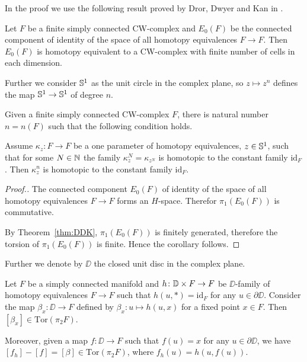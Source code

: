 \documentclass{amsart}
\begin{document}
In the proof we use the following result proved by Dror,  Dwyer and Kan in \cite{DDK}.

\begin{thm}\label{thm:DDK}
Let $F$ be a finite simply connected CW-complex and 
$E_0(F)$ be the connected component of identity of the 
space of all homotopy equivalences $F\to F$. Then $E_0(F)$ is homotopy equivalent to a CW-complex with finite number of cells in each dimension.
\end{thm}

Further we consider ${\Bbb S}^1$ as the unit circle in the complex plane, so  $z\mapsto z^n$ defines the map ${\Bbb S}^1\to {\Bbb S}^1$ of degree $n$.

\begin{cor}\label{cor:DDK}
Given a finite simply connected CW-complex $F$, there is natural number $n=n(F)$ such that the following condition holds.

Assume
$\kappa_z\colon F\to F$ be a one parameter of homotopy equivalences, $z\in{\Bbb S}^1$,
such that for some $N\in{\Bbb N}$ the family $\kappa^N_z=\kappa_{z^N}$ is homotopic to the constant family $\mathrm{id}_F$. 
Then $\kappa^n_z$ is homotopic to the constant family $\mathrm{id}_F$.
\end{cor}

\begin{proof}[Proof.]
The connected component $E_0(F)$ of identity of the 
space of all homotopy equivalences $F\to F$ forms an $H$-space. 
Therefor $\pi_1(E_0(F))$ is commutative. 

By Theorem~\ref{thm:DDK}, $\pi_1(E_0(F))$ is finitely generated,
therefore the torsion of $\pi_1(E_0(F))$ is finite.
Hence the corollary follows.
\end{proof}

Further we denote by $\DD$ the closed unit disc in the complex plane.

\begin{techlem}\label{techlem}
Let $F$ be a simply connected manifold and $h\colon \DD\times F\z\to F$ be 
$\DD$-family of homotopy equivalences $F\to F$ such that $h(u,*)=\mathrm{id}_F$ for any
$u\in\partial \DD$. 
Consider the map $\beta_x\colon \DD\to F$ defined by $\beta_x\colon u\mapsto h(u,x)$ for a fixed point $x\in F$. 
Then $[\beta_x]\in \mathrm{Tor}(\pi_2F)$.

Moreover, given a map $f\colon \DD\to F$ such that $f(u)=x$ for any $u\in\partial \DD$, we have 
$[f_h]-[f]=[\beta]\in \mathrm{Tor}(\pi_2F)$, 
where $f_h(u)=h(u,f(u))$. 
\end{techlem}
\end{document}
